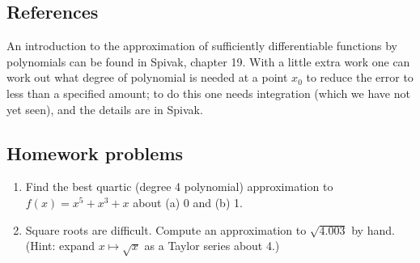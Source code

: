 \subsection{References}
An introduction to the approximation of sufficiently differentiable functions by polynomials can be found
in Spivak, chapter 19. With a little extra work one can work out what degree of polynomial is needed at a
point $ x_0 $ to reduce the error to less than a specified amount; to do this one needs integration (which
we have not yet seen), and the details are in Spivak.

\subsection{Homework problems}
\begin{enumerate}
  \item Find the best quartic (degree 4 polynomial) approximation to $ f(x) = x^5 + x^3 + x $ about (a) 0 and (b) 1.
  \item Square roots are difficult. Compute an approximation to $ \sqrt{4.003} $ by hand. (Hint: expand $ x \mapsto \sqrt{x} $ as a Taylor series about 4.)
\end{enumerate}
